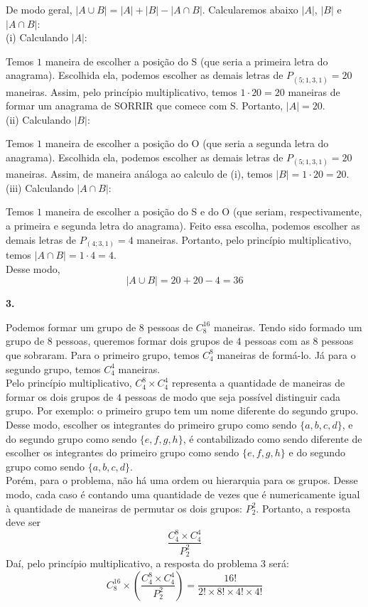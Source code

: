 \documentclass[12pt, a4paper]{article}
\begin{document}
De modo geral, \(\left|A \cup B \right| = |A| + |B| - \left| A \cap B \right|\). Calcularemos abaixo \(|A|\), \(|B|\) e \(\left| A \cap B \right|\): \\

(i) Calculando \(|A|\):

Temos \(1\) maneira de escolher a posição do S (que seria a primeira letra do anagrama). Escolhida ela, podemos escolher as demais letras de \(P_{(5;1,3,1)} = 20\) maneiras. Assim, pelo princípio multiplicativo, temos \(1\cdot{20} = 20\) maneiras de formar um anagrama de SORRIR que comece com S. Portanto, \(|A| = 20\). \\

(ii) Calculando \(|B|\):

Temos \(1\) maneira de escolher a posição do O (que seria a segunda letra do anagrama). Escolhida ela, podemos escolher as demais letras de \(P_{(5;1,3,1)} = 20\) maneiras. Assim, de maneira análoga ao calculo de (i), temos \(|B| = 1\cdot{20} = 20\).\\

(iii) Calculando \(\left|A \cap B \right|\):

Temos \(1\) maneira de escolher a posição do S e do O (que seriam, respectivamente, a primeira e segunda letra do anagrama). Feito essa escolha, podemos escolher as demais letras de \(P_{(4;3,1)} = 4\) maneiras. Portanto, pelo princípio multiplicativo, temos \(\left|A \cap B \right|= 1\cdot{4} = 4\). \\

Desse modo, 
\[\left|A \cup B \right| = 20 + 20 - 4 = 36\]

\textbf{3.}

Podemos formar um grupo de \(8\) pessoas de \(C^{16}_{8}\) maneiras. Tendo sido formado um grupo de \(8\) pessoas, queremos formar dois grupos de \(4\) pessoas com as \(8\) pessoas que sobraram. Para o primeiro grupo, temos \(C^{8}_{4}\) maneiras de formá-lo. Já para o segundo grupo, temos \(C^{4}_{4}\) maneiras. \\

Pelo princípio multiplicativo, \(C^{8}_{4} \times C^{4}_{4}\) representa a quantidade de maneiras de formar os dois grupos de \(4\) pessoas de modo que seja possível distinguir cada grupo. Por exemplo: o primeiro grupo tem um nome diferente do segundo grupo. Desse modo, escolher os integrantes do primeiro grupo como sendo \(\{a,b,c,d\}\), e do segundo grupo como sendo \(\{e,f,g,h\}\), é contabilizado como sendo diferente de escolher os integrantes do primeiro grupo como sendo \(\{e,f,g,h\}\) e do segundo grupo como sendo \(\{a,b,c,d\}\). \\

Porém, para o problema, não há uma ordem ou hierarquia para os  grupos. Desse modo, cada caso é contando uma quantidade de vezes que é numericamente igual à quantidade de maneiras de permutar os dois grupos: \(P^2_2\). Portanto, a resposta deve ser \[\dfrac{C^{8}_{4} \times C^{4}_{4}}{P^2_2}\]
Daí, pelo princípio multiplicativo, a resposta do problema 3 será: \[C^{16}_{8} \times \left( \dfrac{C^{8}_{4} \times C^{4}_{4}}{P^2_2} \right) = \dfrac{16!}{2! \times 8! \times 4! \times 4!}\]
\end{document}
